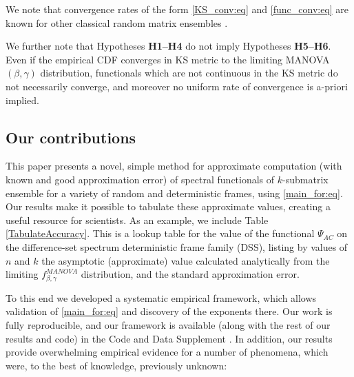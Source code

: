\documentclass[a4paper,12pt]{article}
\newcommand{\TODO}[1]{ {\tt \color{red} [TODO:#1] } }
\begin{document}
We note that convergence rates of the form \eqref{KS_conv:eq} and
\eqref{func_conv:eq} are known for other classical random matrix ensembles 
\cite{Gotze1,Gotze2,chatterjee,meckes}.

We further note that Hypotheses {\bf H1--H4} do not imply Hypotheses {\bf H5--H6}.
Even if the empirical CDF converges in KS metric to the limiting
MANOVA$(\beta,\gamma)$ distribution, 
functionals which are not continuous in the KS metric do not necessarily
converge, and moreover no uniform rate of convergence is a-priori implied.


\subsection*{Our contributions}

This paper presents a novel, simple method for approximate computation (with
known and good approximation error) of spectral functionals of $k$-submatrix
ensemble for a variety of random and deterministic frames, using
\eqref{main_for:eq}.  Our results make it possible to tabulate these 
approximate values, creating a useful resource for scientists. 
As an example, we include Table \ref{TabulateAccuracy}. This is a lookup table
for the value of the functional $\Psi_{AC}$ on the difference-set spectrum
deterministic frame family (DSS), listing by values of $n$ and $k$ 
the asymptotic (approximate) value 
calculated analytically from the limiting $f^{MANOVA}_{\beta,\gamma}$
distribution, 
and the standard approximation error. 

To this end we developed a systematic empirical framework,
which allows validation of \eqref{main_for:eq} and discovery of the exponents
there.  Our work is fully reproducible, and our framework is available (along
with the rest of our results and code) in the Code and Data Supplement
\cite{SDR}.  In addition, our results provide overwhelming empirical evidence
for a number of phenomena, which were, to the best of knowledge, previously
unknown:
\end{document}
